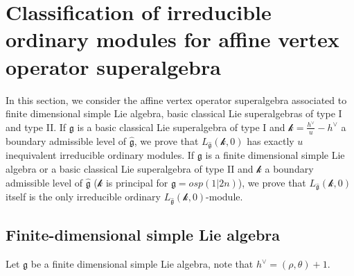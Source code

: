 \documentclass[12pt]{article}
\begin{document}
\section{Classification of irreducible ordinary modules for affine vertex operator superalgebra}
\label{sec:4}
	\def\theequation{4.\arabic{equation}}
	\setcounter{equation}{0}
In this section, we consider the affine vertex operator superalgebra associated to
finite dimensional simple Lie algebra, basic classical Lie superalgebras of type I and type II.
If $\mathfrak{g}$ is a basic classical Lie superalgebra of type I and
$\mathcal{k}=\frac{h^{\vee}}{u}-h^{\vee}$ a boundary admissible level of $\widehat{\mathfrak{g}}$,
we prove that $L_{\widehat{\mathfrak{g}}}(\mathcal{k},0)$ has exactly $u$ inequivalent irreducible ordinary modules.
If $\mathfrak{g}$ is a finite dimensional simple Lie algebra or a basic classical Lie superalgebra of type II and
$\mathcal{k}$ a boundary admissible level of $\widehat{\mathfrak{g}}$ ($\mathcal{k}$ is principal for $\mathfrak{g}=osp(1|2n)$),
we prove that $L_{\widehat{\mathfrak{g}}}(\mathcal{k},0)$ itself is the only irreducible ordinary $L_{\widehat{\mathfrak{g}}}(\mathcal{k},0)$-module.

\subsection{Finite-dimensional simple Lie algebra}
Let $\mathfrak{g}$ be a finite dimensional simple Lie algebra, note that $h^\vee=(\rho,\theta)+1$.
\end{document}
